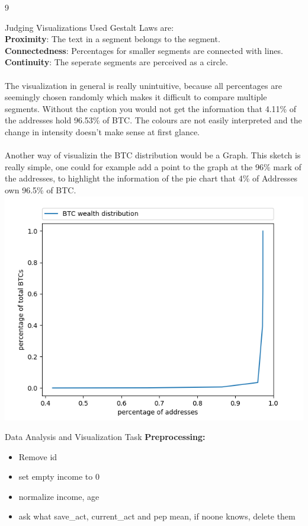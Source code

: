 \documentclass{article}
\begin{document}
\begin{ukon-infie}[17.01.18]{9}
\begin{exercise}[p=8]{Judging Visualizations}
		Used Gestalt Laws are: \\
		\textbf{Proximity}: The text in a segment belongs to the segment.\\
		\textbf{Connectedness}: Percentages for smaller segments are connected with lines.\\
		\textbf{Continuity}: The seperate segments are perceived as a circle.\\\\
		The visualization in general is really unintuitive, because all percentages are seemingly chosen randomly which makes it difficult to compare multiple segments. Without the caption you would not get the information that 4.11\% of the addresses hold 96.53\% of BTC. The colours are not easily interpreted and the change in intensity doesn't make sense at first glance. \\\\
		
 
		Another way of visualizin the BTC distribution would be a Graph. This sketch is really simple, one could for example add a point to the graph at the 96\% mark of the addresses, to highlight the information of the pie chart that 4\% of Addresses own 96.5\% of BTC.\\
		\includegraphics[scale=1]{BTC_wealth_distribution.png}
		\end{exercise}
		\newpage
		\begin{exercise}[p=10]{Data Analysis and Visualization Task}
		\textbf{Preprocessing:}
		
		\begin{itemize}
		\item Remove id
		\item set empty income to 0
		\item normalize income, age
		\item ask what save\_act, current\_act and pep mean, if noone knows, delete them
		\end{itemize}
		

\end{exercise}
\end{ukon-infie}
\end{document}
